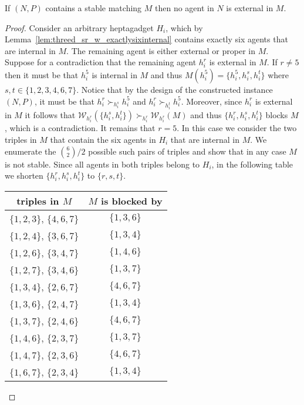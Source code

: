\begin{lem}
If $(N, P)$ contains a stable matching $M$ then no agent in $N$ is external in $M$.
\label{lem:threed_sr_w_noneeexternal}
\end{lem}
\begin{proof}
Consider an arbitrary heptagadget $H_i$, which by Lemma~\ref{lem:threed_sr_w_exactlysixinternal} contains exactly six agents that are internal in $M$. The remaining agent is either external or proper in $M$. Suppose for a contradiction that the remaining agent $h_i^r$ is external in $M$. If $r \neq 5$ then it must be that $h_i^5$ is internal in $M$ and thus $M(h_i^5) = \{ h_i^5, h_i^s, h_i^t \}$ where $s, t \in \{ 1, 2, 3, 4, 6, 7 \}$. Notice that by the design of the constructed instance $(N, P)$, it must be that $h_i^r \succ_{h_i^s} h_i^5$ and $h_i^r \succ_{h_i^t} h_i^5$. Moreover, since $h_i^r$ is external in $M$ it follows that $\mathscr{W}_{h_i^r}(\{ h_i^s, h_i^t \}) \succ_{h_i^r} \mathscr{W}_{h_i^r}(M)$ and thus $\{ h_i^r, h_i^s, h_i^t \}$ blocks $M$, which is a contradiction. It remains that $r = 5$. In this case we consider the two triples in $M$ that contain the six agents in $H_i$ that are internal in $M$. We enumerate the $\binom{6}{2}/2$ possible such pairs of triples and show that in any case $M$ is not stable. Since all agents in both triples belong to $H_i$, in the following table we shorten $\{ h_i^r, h_i^s, h_i^t \}$ to $\{ r, s, t \}$.
\begin{center}
\begin{tabular}{ c c }
triples in $M$ & $M$ is blocked by\Tstrut\Bstrut\\
\hline
$\{1,2,3\}$, $\{4,6,7\}$ & $\{1,3,6\}$\Tstrut\\
$\{1,2,4\}$, $\{3,6,7\}$ & $\{1,3,4\}$ \\
$\{1,2,6\}$, $\{3,4,7\}$ & $\{1,4,6\}$ \\
$\{1,2,7\}$, $\{3,4,6\}$ & $\{1,3,7\}$ \\
$\{1,3,4\}$, $\{2,6,7\}$ & $\{4,6,7\}$ \\
$\{1,3,6\}$, $\{2,4,7\}$ & $\{1,3,4\}$ \\
$\{1,3,7\}$, $\{2,4,6\}$ & $\{4,6,7\}$ \\
$\{1,4,6\}$, $\{2,3,7\}$ & $\{1,3,7\}$ \\
$\{1,4,7\}$, $\{2,3,6\}$ & $\{4,6,7\}$ \\
$\{1,6,7\}$, $\{2,3,4\}$ & $\{1,3,4\}$ \\
\end{tabular}
\end{center}
\end{proof}

